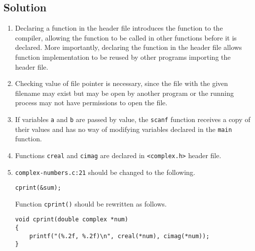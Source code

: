 
\subsection*{Solution}

\begin{enumerate}
\item
Declaring a function in the header file introduces the function to the compiler, allowing the function to be called in other functions before it is declared.
More importantly, declaring the function in the header file allows function implementation to be reused by other programs importing the header file.

\item
Checking value of file pointer is necessary, since the file with the given filename may exist but may be open by another program or the running process may not have permissions to open the file.

\item
If variables \texttt{a} and \texttt{b} are passed by value, the \texttt{scanf} function receives a copy of their values and has no way of modifying variables declared in the \texttt{main} function.

\item
Functions \texttt{creal} and \texttt{cimag} are declared in \texttt{<complex.h>} header file.

\item
\texttt{complex-numbers.c:21} should be changed to the following.
\begin{lstlisting}[numbers=none]
cprint(&sum);
\end{lstlisting}

Function \texttt{cprint()} should be rewritten as follows.
\begin{lstlisting}[numbers=none]
void cprint(double complex *num)
{
	printf("(%.2f, %.2f)\n", creal(*num), cimag(*num));
}
\end{lstlisting}

\end{enumerate}
